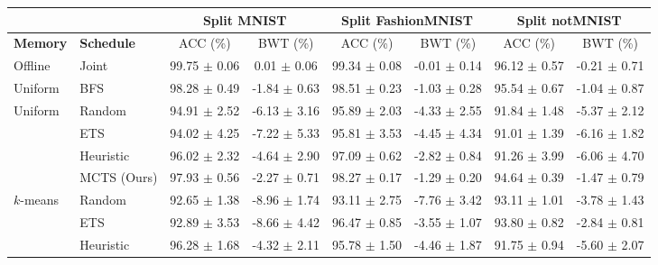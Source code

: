 \begin{tabular}{llcccccc}
	\toprule
	&                 & \multicolumn{2}{c}{\textbf{Split MNIST}} & \multicolumn{2}{c}{\textbf{Split FashionMNIST}} & \multicolumn{2}{c}{\textbf{Split notMNIST}} \\ \midrule
	\textbf{Memory}                 & \textbf{Schedule} & ACC (\%)            & BWT (\%)           & ACC (\%)               & BWT (\%)               & ACC (\%)             & BWT (\%)             \\ \midrule
	Offline                            & Joint           & 99.75 $\pm$ 0.06      & 0.01 $\pm$ 0.06      & 99.34 $\pm$ 0.08         & -0.01 $\pm$ 0.14         & 96.12 $\pm$ 0.57       & -0.21 $\pm$ 0.71       \\ 
	Uniform & BFS & 98.28 $\pm$ 0.49 & -1.84 $\pm$ 0.63 & 98.51 $\pm$ 0.23 & -1.03 $\pm$ 0.28 & 95.54 $\pm$ 0.67 & -1.04 $\pm$ 0.87 \\ \midrule
	\multirow{4}{*}{Uniform}                                   & Random          & 94.91 $\pm$ 2.52      & -6.13 $\pm$ 3.16     & 95.89 $\pm$ 2.03         & -4.33 $\pm$ 2.55         & 91.84 $\pm$ 1.48       & -5.37 $\pm$ 2.12       \\
	& ETS             & 94.02 $\pm$ 4.25      & -7.22 $\pm$ 5.33     & 95.81 $\pm$ 3.53         & -4.45 $\pm$ 4.34         & 91.01 $\pm$ 1.39       & -6.16 $\pm$ 1.82       \\
	& Heuristic         & 96.02 $\pm$ 2.32      & -4.64 $\pm$ 2.90     & 97.09 $\pm$ 0.62         & -2.82 $\pm$ 0.84         & 91.26 $\pm$ 3.99       & -6.06 $\pm$ 4.70       \\
	& MCTS (Ours)            & 97.93 $\pm$ 0.56      & -2.27 $\pm$ 0.71     & 98.27 $\pm$ 0.17         & -1.29 $\pm$ 0.20         & 94.64 $\pm$ 0.39       & -1.47 $\pm$ 0.79       \\ \midrule
	\multirow{4}{*}{$k$-means}  & Random          & 92.65 $\pm$ 1.38      & -8.96 $\pm$ 1.74     & 93.11 $\pm$ 2.75         & -7.76 $\pm$ 3.42         & 93.11 $\pm$ 1.01       & -3.78 $\pm$ 1.43       \\
	& ETS             & 92.89 $\pm$ 3.53      & -8.66 $\pm$ 4.42     & 96.47 $\pm$ 0.85         & -3.55 $\pm$ 1.07         & 93.80 $\pm$ 0.82       & -2.84 $\pm$ 0.81       \\
	& Heuristic         & 96.28 $\pm$ 1.68      & -4.32 $\pm$ 2.11     & 95.78 $\pm$ 1.50         & -4.46 $\pm$ 1.87         & 91.75 $\pm$ 0.94       & -5.60 $\pm$ 2.07       \\

\end{tabular}
